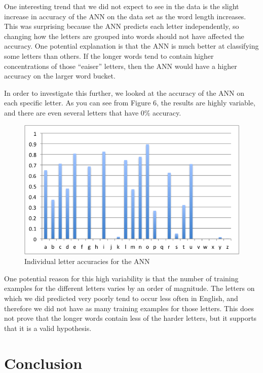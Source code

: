 \documentclass[11pt,a4paper,twocolumn]{article}
\begin{document}
One interesting trend that we did not expect to see in the data is the slight increase in accuracy of the ANN on the data set as the word length increases. This was surprising because the ANN predicts each letter independently, so changing how the letters are grouped into words should not have affected the accuracy. One potential explanation is that the ANN is much better at classifying some letters than others. If the longer words tend to contain higher concentrations of those ``eaiser'' letters, then the ANN would have a higher accuracy on the larger word bucket. 

In order to investigate this further, we looked at the accuracy of the ANN on each specific letter. As you can see from Figure 6, the results are highly variable, and there are even several letters that have 0\% accuracy.

\begin{figure}[h]
\centering
\caption{Individual letter accuracies for the ANN}
\includegraphics[scale=0.55]{img/letterPercentages.png}
\end{figure} 

One potential reason for this high variability is that the number of training examples for the different letters varies by an order of magnitude. The letters on which we did predicted very poorly tend to occur less often in English, and therefore we did not have as many training examples for those letters. This does not prove that the longer words contain less of the harder letters, but it supports that it is a valid hypothesis. 


\section{Conclusion}
\end{document}
